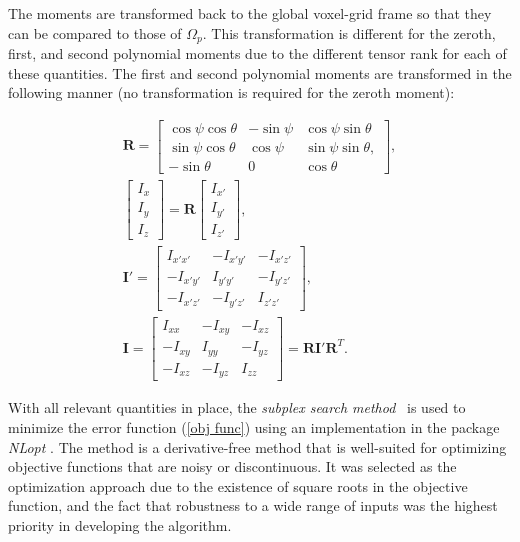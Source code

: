 The moments are transformed back to the global voxel-grid frame so that they can be compared to those of $\Omega_p$. This transformation is different for the zeroth, first, and second polynomial moments due to the different tensor rank for each of these quantities. The first and second polynomial moments are transformed in the following manner (no transformation is required for the zeroth moment):
\begin{linenomath}\begin{gather}
\bm{R} = \left[\begin{array} {ccc} {\cos\psi\cos\theta} & {-\sin\psi} & {\cos\psi\sin\theta}\\ {\sin\psi\cos\theta} & {\cos\psi} & {\sin\psi\sin\theta}, \\
{-\sin\theta} & {0} & {\cos\theta}\end{array} \right], \\
\left[\begin{array} {ccc} {I_x} \\ {I_y} \\ {I_z} \end{array} \right] = \bm{R} \left[\begin{array} {ccc} {I_{x'}} \\ {I_{y'}} \\ {I_{z'}} \end{array} \right], \\
\bm{I}' = \left[\begin{array} {ccc} {I_{x'x'}} & {-I_{x'y'}} & {-I_{x'z'}}\\ {-I_{x'y'}} & {I_{y'y'}} & {-I_{y'z'}} \\ -{I_{x'z'}} & {-I_{y'z'}} & {I_{z'z'}} \end{array} \right], \\
\bm{I} = \left[\begin{array} {ccc} {I_{xx}} & {-I_{xy}} & {-I_{xz}}\\ {-I_{xy}} & {I_{yy}} & {-I_{yz}} \\ -{I_{xz}} & {-I_{yz}} & {I_{zz}} \end{array} \right] = \bm{R}\bm{I}'\mathbf{R}^T.
\end{gather}\end{linenomath}

With all relevant quantities in place, the \textit{subplex search method}~\cite{rowan} is used to minimize the error function (\ref{obj func}) using an implementation in the package \textit{NLopt} \cite{nlo}. The method is a derivative-free method that is well-suited for optimizing objective functions that are noisy or discontinuous. It was selected as the optimization approach due to the existence of square roots in the objective function, and the fact that robustness to a wide range of inputs was the highest priority in developing the algorithm.

